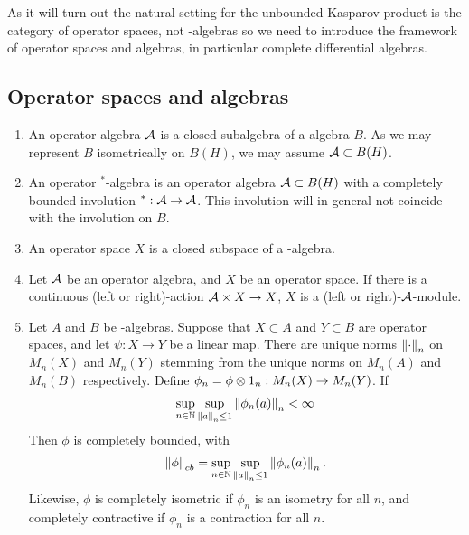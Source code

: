 As it will turn out the natural setting for the unbounded Kasparov product is the category of operator spaces, not \Cstar-algebras so we need to introduce the framework of operator spaces and algebras, in particular complete differential algebras.
\subsection{Operator spaces and algebras}
\begin{definition}
\begin{enumerate}
\item 
	An operator algebra $\mathcal{A}$ is a closed subalgebra of a \Cstar algebra $B$. As we may represent $B$ isometrically on $B(H)$, we may assume $\mathcal{A}\subset B(H)$. 
\item
	An operator $^*$-algebra is an operator algebra $\mathcal{A}\subset B(H)$ with a completely bounded involution $^*:\mathcal{A}\to \mathcal{A}$. This involution will in general not coincide with the involution on $B$.
\item	
	An operator space $X$ is a closed subspace of a \Cstar-algebra.
\item 
	Let $\mathcal{A}$ be an operator algebra, and $X$ be an operator space. If there is a continuous (left or right)-action $\mathcal{A}\times X\to X$, $X$ is a (left or right)-$\mathcal{A}$-module. 
\item
	Let $A$ and $B$ be \Cstar-algebras. Suppose that $X\subset A$ and $Y\subset B$ are operator spaces, and let $\psi:X\to Y$ be a linear map. There are unique norms $\left \Vert \cdot \right \Vert_n$ on $M_n(X)$ and $M_n(Y)$ stemming from the unique norms on $M_n(A)$ and $M_n(B)$ respectively. 
	Define $\phi_n=\phi \tens 1_n:M_n(X)\to M_n(Y)$. If 
	\begin{align*}
		\sup_{n\in \N} \sup_{\norm{a}_n\leq 1}\norm{\phi_n(a)}_{n}<\infty
	\end{align*}
	Then $\phi$ is completely bounded, with 
	\begin{align*} 
		\norm{\phi}_{cb}=	\sup_{n\in \N} \sup_{\norm{a}_n\leq 1}\norm{\phi_n(a)}_{n}. 
	\end{align*} 
	Likewise, $\phi$ is completely isometric if $\phi_n$ is an isometry for all $n$, and completely contractive if $\phi_n$ is a contraction for all $n$. 
\end{enumerate}
\end{definition}




